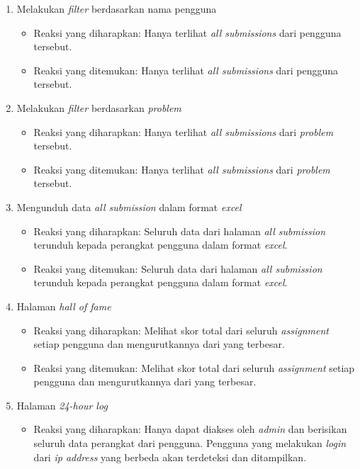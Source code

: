 \begin{enumerate}
\begin{itemize}
	 \end{itemize}
	 \item Melakukan \textit{filter} berdasarkan nama pengguna
	 \begin{itemize}
	 	\item Reaksi yang diharapkan: Hanya terlihat \textit{all submissions} dari pengguna tersebut.
	 	\item Reaksi yang ditemukan: Hanya terlihat \textit{all submissions} dari pengguna tersebut.
	 \end{itemize}
	 \item Melakukan \textit{filter} berdasarkan \textit{problem}
	 \begin{itemize}
	 	\item Reaksi yang diharapkan: Hanya terlihat \textit{all submissions} dari \textit{problem} tersebut.
	 	\item Reaksi yang ditemukan: Hanya terlihat \textit{all submissions} dari \textit{problem} tersebut.
	 \end{itemize}
	 \item Mengunduh data \textit{all submission} dalam format \textit{excel}
	 \begin{itemize}
	 	\item Reaksi yang diharapkan: Seluruh data dari halaman \textit{all submission} terunduh kepada perangkat pengguna dalam format \textit{excel}.
	 	\item Reaksi yang ditemukan: Seluruh data dari halaman \textit{all submission} terunduh kepada perangkat pengguna dalam format \textit{excel}.
	 \end{itemize}
	 \item Halaman \textit{hall of fame}
	 \begin{itemize}
	 	\item Reaksi yang diharapkan: Melihat skor total dari seluruh \textit{assignment} setiap pengguna dan mengurutkannya dari yang terbesar.
	 	\item Reaksi yang ditemukan: Melihat skor total dari seluruh \textit{assignment} setiap pengguna dan mengurutkannya dari yang terbesar.
	 \end{itemize}
	 \item Halaman \textit{24-hour log}
	 \begin{itemize}
	 	\item Reaksi yang diharapkan: Hanya dapat diakses oleh \textit{admin} dan berisikan seluruh data perangkat dari pengguna. Pengguna yang melakukan \textit{login} dari \textit{ip address} yang berbeda akan terdeteksi dan ditampilkan.

\end{itemize}
\end{enumerate}
